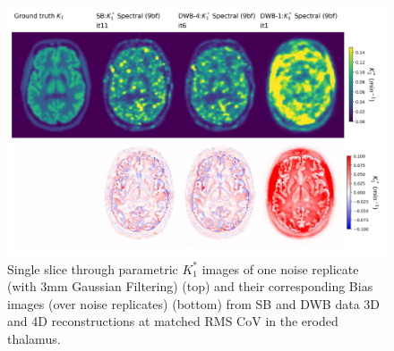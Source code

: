\begin{figure} [h!]
\centering
\includegraphics[scale=0.47,angle=0]{3_Results/3_2_Dynamic_Reconstruction_SimulationStudy/figures/BrainCuts/K1_BrainCuts.pdf}
\caption{Single slice through parametric $K_1^*$ images of one noise replicate (with 3mm Gaussian Filtering) (top) and their corresponding Bias images (over noise replicates) (bottom) from SB and DWB data 3D and 4D reconstructions at matched RMS CoV in the eroded thalamus.}
\label{fig:K1_cuts_bias_matched_rms_CoV}
\end{figure} 


